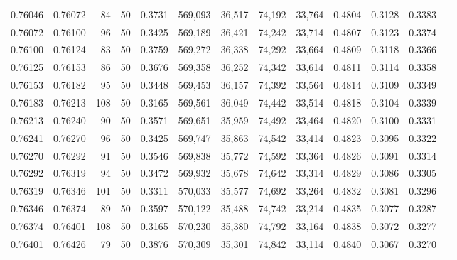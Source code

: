 \begin{tabular}{rrrrrrrrrrrrr}
0.76046 & 0.76072 &    84 &  50 &                                     0.3731 & 569,093 &  36,517 &  74,192 &  33,764 & 0.4804 & 0.3128 & 0.3383 \\
0.76072 & 0.76100 &    96 &  50 &                                     0.3425 & 569,189 &  36,421 &  74,242 &  33,714 & 0.4807 & 0.3123 & 0.3374 \\
0.76100 & 0.76124 &    83 &  50 &                                     0.3759 & 569,272 &  36,338 &  74,292 &  33,664 & 0.4809 & 0.3118 & 0.3366 \\
0.76125 & 0.76153 &    86 &  50 &                                     0.3676 & 569,358 &  36,252 &  74,342 &  33,614 & 0.4811 & 0.3114 & 0.3358 \\
0.76153 & 0.76182 &    95 &  50 &                                     0.3448 & 569,453 &  36,157 &  74,392 &  33,564 & 0.4814 & 0.3109 & 0.3349 \\
0.76183 & 0.76213 &   108 &  50 &                                     0.3165 & 569,561 &  36,049 &  74,442 &  33,514 & 0.4818 & 0.3104 & 0.3339 \\
0.76213 & 0.76240 &    90 &  50 &                                     0.3571 & 569,651 &  35,959 &  74,492 &  33,464 & 0.4820 & 0.3100 & 0.3331 \\
0.76241 & 0.76270 &    96 &  50 &                                     0.3425 & 569,747 &  35,863 &  74,542 &  33,414 & 0.4823 & 0.3095 & 0.3322 \\
0.76270 & 0.76292 &    91 &  50 &                                     0.3546 & 569,838 &  35,772 &  74,592 &  33,364 & 0.4826 & 0.3091 & 0.3314 \\
0.76292 & 0.76319 &    94 &  50 &                                     0.3472 & 569,932 &  35,678 &  74,642 &  33,314 & 0.4829 & 0.3086 & 0.3305 \\
0.76319 & 0.76346 &   101 &  50 &                                     0.3311 & 570,033 &  35,577 &  74,692 &  33,264 & 0.4832 & 0.3081 & 0.3296 \\
0.76346 & 0.76374 &    89 &  50 &                                     0.3597 & 570,122 &  35,488 &  74,742 &  33,214 & 0.4835 & 0.3077 & 0.3287 \\
0.76374 & 0.76401 &   108 &  50 &                                     0.3165 & 570,230 &  35,380 &  74,792 &  33,164 & 0.4838 & 0.3072 & 0.3277 \\
0.76401 & 0.76426 &    79 &  50 &                                     0.3876 & 570,309 &  35,301 &  74,842 &  33,114 & 0.4840 & 0.3067 & 0.3270 \\

\end{tabular}

